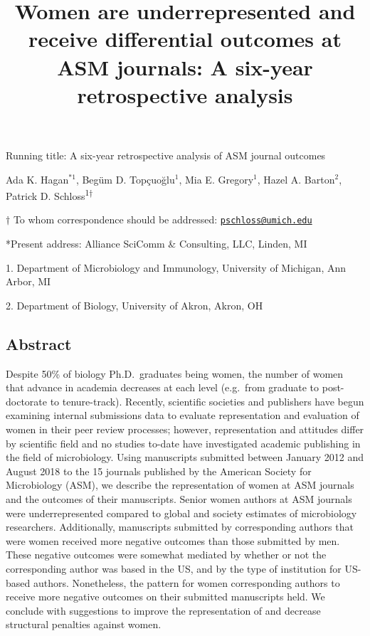 \documentclass[11pt,]{article}
\title{\textbf{Women are underrepresented and receive differential outcomes at
ASM journals: A six-year retrospective analysis}}
\author{}
\date{}
\begin{document}
\maketitle

\vspace{35mm}

Running title: A six-year retrospective analysis of ASM journal outcomes

\vspace{35mm}

Ada K. Hagan\(^{*1}\), Begüm D. Topçuoğlu\({^1}\), Mia E.
Gregory\({^1}\), Hazel A. Barton\({^2}\), Patrick D.
Schloss\textsuperscript{1\(\dagger\)}

\vspace{40mm}

\(\dagger\) To whom correspondence should be addressed:
\href{mailto:pschloss@umich.edu}{\nolinkurl{pschloss@umich.edu}}

*Present address: Alliance SciComm \& Consulting, LLC, Linden, MI

1. Department of Microbiology and Immunology, University of Michigan,
Ann Arbor, MI

2. Department of Biology, University of Akron, Akron, OH

\newpage
\linenumbers

\hypertarget{abstract}{%
\subsection{Abstract}\label{abstract}}

Despite 50\% of biology Ph.D.~graduates being women, the number of women
that advance in academia decreases at each level (e.g.~from graduate to
post-doctorate to tenure-track). Recently, scientific societies and
publishers have begun examining internal submissions data to evaluate
representation and evaluation of women in their peer review processes;
however, representation and attitudes differ by scientific field and no
studies to-date have investigated academic publishing in the field of
microbiology. Using manuscripts submitted between January 2012 and
August 2018 to the 15 journals published by the American Society for
Microbiology (ASM), we describe the representation of women at ASM
journals and the outcomes of their manuscripts. Senior women authors at
ASM journals were underrepresented compared to global and society
estimates of microbiology researchers. Additionally, manuscripts
submitted by corresponding authors that were women received more
negative outcomes than those submitted by men. These negative outcomes
were somewhat mediated by whether or not the corresponding author was
based in the US, and by the type of institution for US-based authors.
Nonetheless, the pattern for women corresponding authors to receive more
negative outcomes on their submitted manuscripts held. We conclude with
suggestions to improve the representation of and decrease structural
penalties against women.
\end{document}
